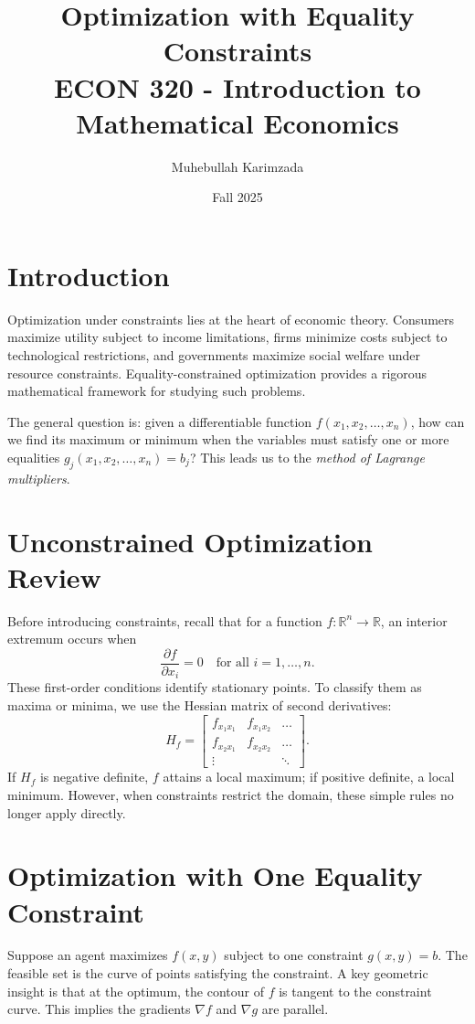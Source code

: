 \documentclass[12pt]{article}
\title{Optimization with Equality Constraints\\[7pt]
\large ECON 320 - Introduction to Mathematical Economics}
\author{Muhebullah Karimzada}
\date{Fall 2025}
\newcommand{\R}{\mathbb{R}}
\newcommand{\grad}{\nabla}
\begin{document}
\maketitle

\section*{Introduction}

Optimization under constraints lies at the heart of economic theory. Consumers maximize utility subject to income limitations, firms minimize costs subject to technological restrictions, and governments maximize social welfare under resource constraints. Equality-constrained optimization provides a rigorous mathematical framework for studying such problems.

The general question is: given a differentiable function \( f(x_1, x_2, \dots, x_n) \), how can we find its maximum or minimum when the variables must satisfy one or more equalities \( g_j(x_1, x_2, \dots, x_n) = b_j \)? This leads us to the \textit{method of Lagrange multipliers}.

\section*{Unconstrained Optimization Review}

Before introducing constraints, recall that for a function \( f:\R^n \to \R \), an interior extremum occurs when
\[
\frac{\partial f}{\partial x_i} = 0 \quad \text{for all } i = 1, \dots, n.
\]
These first-order conditions identify stationary points. To classify them as maxima or minima, we use the Hessian matrix of second derivatives:
\[
H_f =
\begin{bmatrix}
f_{x_1x_1} & f_{x_1x_2} & \dots \\
f_{x_2x_1} & f_{x_2x_2} & \dots \\
\vdots & & \ddots
\end{bmatrix}.
\]
If \( H_f \) is negative definite, \( f \) attains a local maximum; if positive definite, a local minimum. However, when constraints restrict the domain, these simple rules no longer apply directly.

\section*{Optimization with One Equality Constraint}

Suppose an agent maximizes \( f(x,y) \) subject to one constraint \( g(x,y) = b \). The feasible set is the curve of points satisfying the constraint. A key geometric insight is that at the optimum, the contour of \( f \) is tangent to the constraint curve. This implies the gradients \( \grad f \) and \( \grad g \) are parallel.
\end{document}
